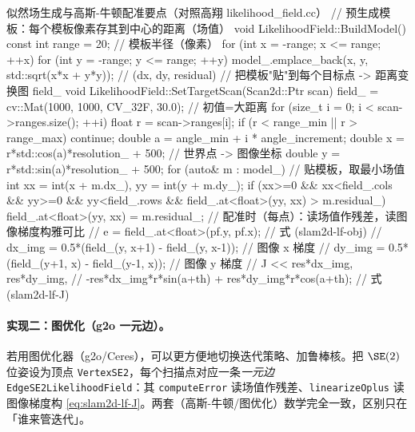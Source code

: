 \begin{codebox}[C++]{似然场生成与高斯-牛顿配准要点（对照高翔 likelihood\_field.cc）}
// 预生成模板：每个模板像素存其到中心的距离（场值）
void LikelihoodField::BuildModel() {
  const int range = 20;                  // 模板半径（像素）
  for (int x = -range; x <= range; ++x)
    for (int y = -range; y <= range; ++y)
      model_.emplace_back(x, y, std::sqrt(x*x + y*y)); // (dx, dy, residual)
}
// 把模板"贴"到每个目标点 -> 距离变换图 field_
void LikelihoodField::SetTargetScan(Scan2d::Ptr scan) {
  field_ = cv::Mat(1000, 1000, CV_32F, 30.0);          // 初值=大距离
  for (size_t i = 0; i < scan->ranges.size(); ++i) {
    float r = scan->ranges[i]; if (r < range_min || r > range_max) continue;
    double a = angle_min + i * angle_increment;
    double x = r*std::cos(a)*resolution_ + 500;        // 世界点 -> 图像坐标
    double y = r*std::sin(a)*resolution_ + 500;
    for (auto& m : model_) {                            // 贴模板，取最小场值
      int xx = int(x + m.dx_), yy = int(y + m.dy_);
      if (xx>=0 && xx<field_.cols && yy>=0 && yy<field_.rows
          && field_.at<float>(yy, xx) > m.residual_)
        field_.at<float>(yy, xx) = m.residual_;
    }
  }
}
// 配准时（每点）：读场值作残差，读图像梯度构雅可比
// e        = field_.at<float>(pf.y, pf.x);              // 式 (slam2d-lf-obj)
// dx_img   = 0.5*(field_(y, x+1) - field_(y, x-1));     // 图像 x 梯度
// dy_img   = 0.5*(field_(y+1, x) - field_(y-1, x));     // 图像 y 梯度
// J << res*dx_img, res*dy_img,
//      -res*dx_img*r*sin(a+th) + res*dy_img*r*cos(a+th); // 式 (slam2d-lf-J)
\end{codebox}

\paragraph{实现二：图优化（g2o 一元边）。}
若用图优化器（g2o/Ceres），可以更方便地切换迭代策略、加鲁棒核。把 $\SE(2)$ 位姿设为顶点 \texttt{VertexSE2}，每个扫描点对应一条\emph{一元边} \texttt{EdgeSE2LikelihoodField}：其 \texttt{computeError} 读场值作残差、\texttt{linearizeOplus} 读图像梯度构 \cref{eq:slam2d-lf-J}。两套（高斯-牛顿/图优化）数学完全一致，区别只在「谁来管迭代」。

